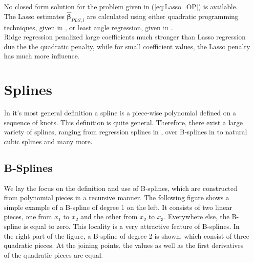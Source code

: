\documentclass[10pt,a4paper]{article}
\begin{document}
No closed form solution for the problem given in (\ref{eq:Lasso_OP}) is available. The Lasso estimates $\boldsymbol{\hat{\beta}}_{PLS,l}$ are calculated using either quadratic programming techniques, given in \cite{tibshirani1996lasso}, or least angle regression, given in \cite{efron2004leastangleregression}. \\

Ridge regression penalized large coefficients much stronger than Lasso regression due the the quadratic penalty, while for small coefficient values, the Lasso penalty has much more influence. \cite{tibshirani1996lasso}

\section{Splines} \label{SectionSplines}
	
In it's most general definition a spline is a piece-wise polynomial defined on a sequence of knots. This definition is quite general. Therefore, there exist a large variety of splines, ranging from regression splines in \cite{eubank1990regressionsplines}, over B-splines in \cite{deBoor1978practicalGuideToSplines} to natural cubic splines and many more.
\subsection{B-Splines}

We lay the focus on the definition and use of B-splines, which are constructed from polynomial pieces in a recursive manner. The following figure shows a simple example of a B-spline of degree 1 on the left. It consists of two linear pieces, one from $x_1$ to $x_2$ and the other from $x_2$ to $x_3$. Everywhere else, the B-spline is equal to zero. This locality is a very attractive feature of B-splines. In the right part of the figure, a B-spline of degree 2 is shown, which consist of three quadratic pieces. At the joining points, the values as well as the first derivatives of the quadratic pieces are equal. 
\end{document}

